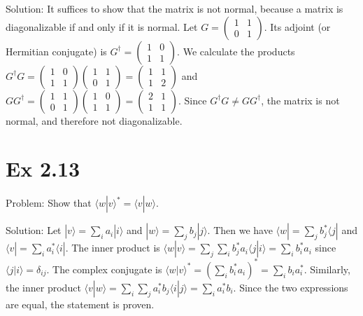 \documentclass{article}
\newcommand{\0}{{$|0\rangle$}}
\newcommand{\1}{{$|1\rangle$}}
\begin{document}
Solution: It suffices to show that the matrix is not normal, because a matrix is diagonalizable if and only if it is normal. Let $ G = \begin{pmatrix} 1 & 1 \\ 0 & 1 \end{pmatrix} $. Its adjoint (or Hermitian conjugate) is $ G^\dagger = \begin{pmatrix} 1 & 0 \\ 1 & 1 \end{pmatrix} $. We calculate the products $ G^\dagger G = \begin{pmatrix} 1 & 0 \\ 1 & 1 \end{pmatrix} \begin{pmatrix} 1 & 1 \\ 0 & 1 \end{pmatrix} = \begin{pmatrix} 1 & 1 \\ 1 & 2 \end{pmatrix} $ and $ G G^\dagger = \begin{pmatrix} 1 & 1 \\ 0 & 1 \end{pmatrix} \begin{pmatrix} 1 & 0 \\ 1 & 1 \end{pmatrix} = \begin{pmatrix} 2 & 1 \\ 1 & 1 \end{pmatrix} $. Since $ G^\dagger G \neq G G^\dagger $, the matrix is not normal, and therefore not diagonalizable.

\newpage
\section*{Ex 2.13 } 
Problem: Show that $ \langle w|v \rangle^* = \langle v|w \rangle $.  

Solution: Let $ |v\rangle = \sum_i a_i |i\rangle $ and $ |w\rangle = \sum_j b_j |j\rangle $. Then we have $ \langle w| = \sum_j b_j^* \langle j| $ and $ \langle v| = \sum_i a_i^* \langle i| $. The inner product is  
$ \langle w|v \rangle = \sum_j \sum_i b_j^* a_i \langle j|i \rangle = \sum_i b_i^* a_i $  
since $ \langle j|i \rangle = \delta_{ij} $. The complex conjugate is  
$ \langle w|v \rangle^* = \left(\sum_i b_i^* a_i\right)^* = \sum_i b_i a_i^* $. Similarly, the inner product  
$ \langle v|w \rangle = \sum_i \sum_j a_i^* b_j \langle i|j \rangle = \sum_i a_i^* b_i $. Since the two expressions are equal, the statement is proven.
\end{document}

